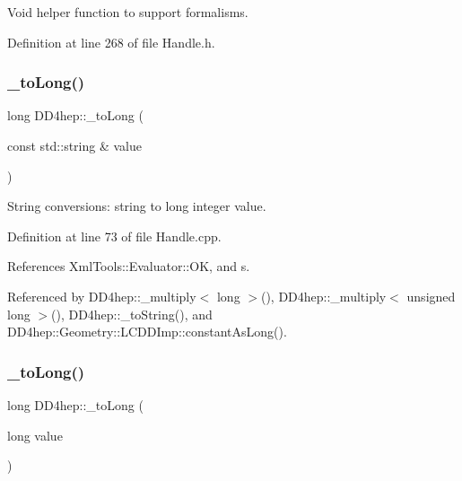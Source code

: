 Void helper function to support formalisms. 



Definition at line 268 of file Handle.\+h.

\hypertarget{group___d_d4_h_e_p___g_e_o_m_e_t_r_y_ga76414f0a43017580942c20cd07143439}{}\label{group___d_d4_h_e_p___g_e_o_m_e_t_r_y_ga76414f0a43017580942c20cd07143439} 
\subsubsection{\texorpdfstring{\+\_\+to\+Long()}{\_toLong()}\hspace{0.1cm}{\footnotesize\ttfamily [1/2]}}
{\footnotesize\ttfamily long D\+D4hep\+::\+\_\+to\+Long (\begin{DoxyParamCaption}\item[{const std\+::string \&}]{value }\end{DoxyParamCaption})}



String conversions\+: string to long integer value. 



Definition at line 73 of file Handle.\+cpp.



References Xml\+Tools\+::\+Evaluator\+::\+OK, and s.



Referenced by D\+D4hep\+::\+\_\+multiply$<$ long $>$(), D\+D4hep\+::\+\_\+multiply$<$ unsigned long $>$(), D\+D4hep\+::\+\_\+to\+String(), and D\+D4hep\+::\+Geometry\+::\+L\+C\+D\+D\+Imp\+::constant\+As\+Long().

\hypertarget{group___d_d4_h_e_p___g_e_o_m_e_t_r_y_ga23a2ee3f07c47743d8a313babfb82841}{}\label{group___d_d4_h_e_p___g_e_o_m_e_t_r_y_ga23a2ee3f07c47743d8a313babfb82841} 
\subsubsection{\texorpdfstring{\+\_\+to\+Long()}{\_toLong()}\hspace{0.1cm}{\footnotesize\ttfamily [2/2]}}
{\footnotesize\ttfamily long D\+D4hep\+::\+\_\+to\+Long (\begin{DoxyParamCaption}\item[{long}]{value }\end{DoxyParamCaption})\hspace{0.3cm}{\ttfamily [inline]}}



